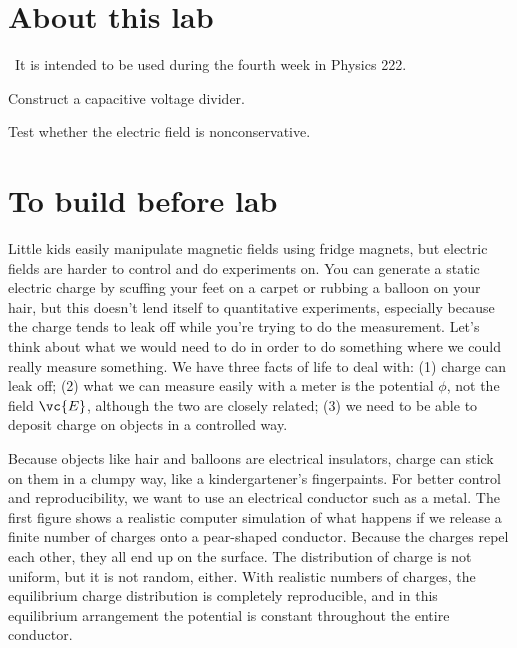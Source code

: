 \renewcommand\thechapter{c2.4}
\label{lab:electric-field}

\section*{About this lab}

\covid\ 
It is intended to be used during the fourth week in Physics 222.

\apparatus
{}

\begin{goals}

\item[] Construct a capacitive voltage divider.

\item[] Test whether the electric field is nonconservative.

\end{goals}

\section*{To build before lab}
\makebanana

\introduction

Little kids easily manipulate magnetic fields using fridge magnets,
but electric fields are harder to control and do experiments on.
You can generate a static electric charge by scuffing your feet on
a carpet or rubbing a balloon on your hair, but this doesn't lend itself
to quantitative experiments, especially because the charge tends to
leak off while you're trying to do the measurement. Let's think about
what we would need to do in order to do something where we could really
measure something. We have three facts of life to deal with: (1) charge
can leak off; (2) what we can measure easily with a meter is the
potential $\phi$, not the field $\vc{E}$, although the two are closely
related; (3) we need to be able to deposit charge on objects in a controlled way.

Because objects like hair and balloons are electrical insulators,
charge can stick on them in a clumpy way, like a kindergartener's
fingerpaints. For better control and reproducibility, we want to use
an electrical conductor such as a metal. The first figure shows a realistic
computer simulation of what happens if we release a finite number of
charges onto a pear-shaped conductor. Because the charges  repel each
other, they all end up on the surface. The distribution of charge is
not uniform, but it is not random, either. With realistic numbers of
charges, the equilibrium charge distribution is completely reproducible,
and in this equilibrium arrangement the potential is constant throughout
the entire conductor.

